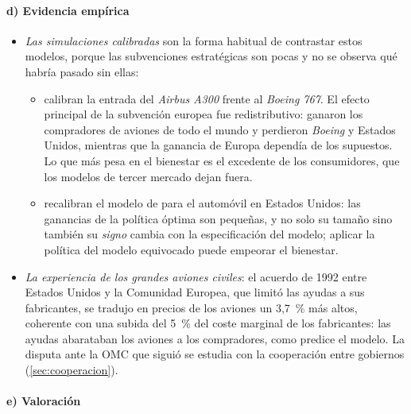 \documentclass[11pt]{article}
\begin{document}
\paragraph{d) Evidencia empírica}

\begin{itemize}
\item \emph{Las simulaciones calibradas} son la forma habitual de contrastar estos modelos, porque las subvenciones estratégicas son pocas y no se observa qué habría pasado sin ellas:
  \begin{itemize}
  \item \textcite{BaldwinKrugman1988Industrial} calibran la entrada del \emph{Airbus A300} frente al \emph{Boeing 767}. El efecto principal de la subvención europea fue redistributivo: ganaron los compradores de aviones de todo el mundo y perdieron \emph{Boeing} y Estados Unidos, mientras que la ganancia de Europa dependía de los supuestos. Lo que más pesa en el bienestar es el excedente de los consumidores, que los modelos de tercer mercado dejan fuera.
  \item \textcite{KrishnaHoganSwagel1989Non} recalibran el modelo de \textcite{Dixit1988Optimal} para el automóvil en Estados Unidos: las ganancias de la política óptima son pequeñas, y no solo su tamaño sino también su \emph{signo} cambia con la especificación del modelo; aplicar la política del modelo equivocado puede empeorar el bienestar.
  \end{itemize}
\item \emph{La experiencia de los grandes aviones civiles}: el acuerdo de 1992 entre Estados Unidos y la Comunidad Europea, que limitó las ayudas a sus fabricantes, se tradujo en precios de los aviones un 3,7~\% más altos, coherente con una subida del 5~\% del coste marginal de los fabricantes\nocite{IrwinPavcnik2004Airbus}: las ayudas abarataban los aviones a los compradores, como predice el modelo. La disputa ante la OMC que siguió se estudia con la cooperación entre gobiernos (\ref{sec:cooperacion}).
\end{itemize}

\paragraph{e) Valoración}
\end{document}

